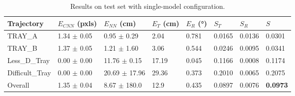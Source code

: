 \begin{table}[H]
\label{tab:single-model test results}
\centering
\begin{tabular}{l | l l l l | l l | l}
\toprule
Trajectory & $E_{CNN}$ (pxls) & $E_{NN}$ (cm) & $E_T$ (cm)& $E_R$ (°)& $S_T$ & $S_R$ & $S$\\
\midrule
TRAY\_A & 1.34 $\pm$ 0.05 & 0.95 $\pm$ 0.29 & 2.04 & 0.781 & 0.0165 & 0.0136 & 0.0301\\
TRAY\_B & 1.37 $\pm$ 0.05 & 1.21 $\pm$ 1.60 & 3.06 & 0.544 & 0.0246 & 0.0095 & 0.0341\\
Less\_D\_Tray & 0.00 $\pm$ 0.00 & 11.76 $\pm$ 0.15 & 17.19 & 0.045 & 0.1166 & 0.0008 & 0.1174\\
Difficult\_Tray & 0.00 $\pm$ 0.00 & 20.69 $\pm$ 17.96 & 29.36 & 0.373 & 0.2010 & 0.0065 & 0.2075\\
\midrule
Overall & 1.35 $\pm$ 0.04 & 8.67 $\pm$ 180.0 & 12.9 & 0.435 & 0.0897 & 0.0076 & \textbf{0.0973}\\
\bottomrule
\end{tabular}
\caption{Results on test set with single-model configuration.}
\end{table}